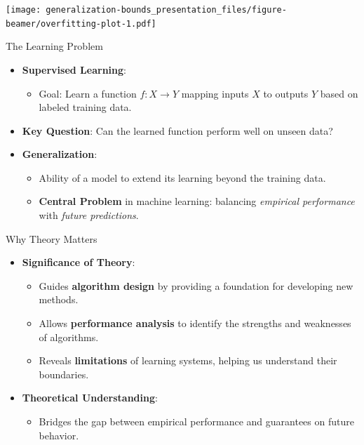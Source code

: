 \documentclass[
  ignorenonframetext,
]{beamer}
\providecommand{\tightlist}{%
  \setlength{\itemsep}{0pt}\setlength{\parskip}{0pt}}\usepackage{longtable,booktabs,array}
\begin{document}
\begin{frame}
\texttt{[image: generalization-bounds\_presentation\_files/figure-beamer/overfitting-plot-1.pdf]}
\end{frame}

\begin{frame}{The Learning Problem}
\label{the-learning-problem}
\begin{itemize}
\tightlist
\item
  \textbf{Supervised Learning}:

  \begin{itemize}
  \tightlist
  \item
    Goal: Learn a function \(f: X \to Y\) mapping inputs \(X\) to
    outputs \(Y\) based on labeled training data.
  \end{itemize}
\item
  \textbf{Key Question}: Can the learned function perform well on unseen
  data?
\item
  \textbf{Generalization}:

  \begin{itemize}
  \tightlist
  \item
    Ability of a model to extend its learning beyond the training data.
  \item
    \textbf{Central Problem} in machine learning: balancing
    \emph{empirical performance} with \emph{future predictions}.
  \end{itemize}
\end{itemize}
\end{frame}

\begin{frame}{Why Theory Matters}
\label{why-theory-matters}
\begin{itemize}
\tightlist
\item
  \textbf{Significance of Theory}:

  \begin{itemize}
  \tightlist
  \item
    Guides \textbf{algorithm design} by providing a foundation for
    developing new methods.
  \item
    Allows \textbf{performance analysis} to identify the strengths and
    weaknesses of algorithms.
  \item
    Reveals \textbf{limitations} of learning systems, helping us
    understand their boundaries.
  \end{itemize}
\item
  \textbf{Theoretical Understanding}:

  \begin{itemize}
  \tightlist
  \item
    Bridges the gap between empirical performance and guarantees on
    future behavior.
  \end{itemize}
\end{itemize}
\end{frame}
\end{document}
